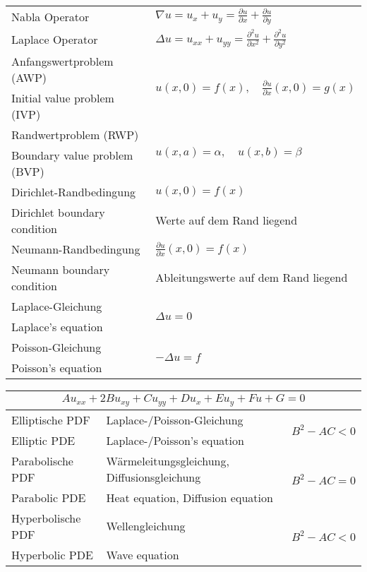 \documentclass[
	final,
	a4paper,
	oneside,
	parskip=full,
	headings=standardclasses,
	headings=big,
	pointednumbers,
    fleqn
]{scrartcl}
\newcommand{\f}[2]{\frac{#1}{#2}}
\newcommand{\kl}[1]{{\left( #1 \right)}}
\begin{document}
    \begin{tabular}{ll}
        Nabla Operator                  & $\nabla{u} = u_{x}+u_{y} = \frac{\partial u}{\partial x} + \frac{\partial u}{\partial y}$ \\
        Laplace Operator                & $\Delta{u} = u_{xx} + u_{yy} = \frac{\partial^2 u}{\partial x^2} + \frac{\partial^2 u}{\partial y^2} $\\
        \hline
        \hline
        Anfangswertproblem (AWP)        & \multirow{2}{*}{$u\kl{x,0} = f\kl{x}, \quad {\textstyle\f{\partial u}{\partial x}}\kl{x,0} = g\kl{x}$} \\
        Initial value problem (IVP)     & \\
        \hline
        Randwertproblem (RWP)           & \multirow{2}{*}{$u\kl{x,a} = \alpha, \quad u\kl{x,b} = \beta $} \\
        Boundary value problem (BVP)    & \\
        \hline
        Dirichlet-Randbedingung         & $u\kl{x,0} = f\kl{x}$ \\
        Dirichlet boundary condition    & Werte auf dem Rand liegend \\
        \hline
        Neumann-Randbedingung           & ${\textstyle\f{\partial u}{\partial x}}\kl{x,0} = f\kl{x}$ \\
        Neumann boundary condition      & Ableitungswerte auf dem Rand liegend \\
        \hline
        Laplace-Gleichung               & \multirow{2}{*}{$\Delta u = 0 $}\\
        Laplace's equation              & \\
        \hline
        Poisson-Gleichung               & \multirow{2}{*}{$-\Delta u = f $}\\
        Poisson's equation              &
    \end{tabular}

    \begin{tabular}{lll}
        \multicolumn{3}{c}{$ Au_{xx} + 2Bu_{xy} + Cu_{yy} + Du_x + Eu_y + Fu +G= 0 $} \\
        \hline
        Elliptische PDF                 & Laplace-/Poisson-Gleichung    & \multirow{2}{*}{$ B^2 - AC < 0$} \\
        Elliptic PDE                    & Laplace-/Poisson's equation   & \\
        \hline
        Parabolische PDF                & Wärmeleitungsgleichung, Diffusionsgleichung         & \multirow{2}{*}{$ B^2 - AC = 0$} \\
        Parabolic PDE                   & Heat equation, Diffusion equation                 & \\
        \hline
        Hyperbolische PDF               & Wellengleichung               & \multirow{2}{*}{$ B^2 - AC < 0 $} \\
        Hyperbolic PDE                  & Wave equation                 &
    \end{tabular}
\end{document}
